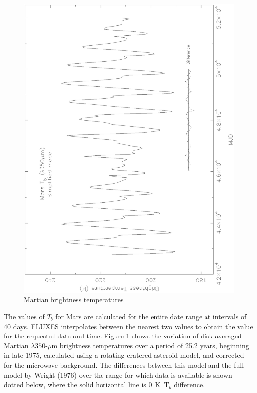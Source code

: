 \documentclass[11pt,twoside]{article}
\renewcommand{\_}{\texttt{\symbol{95}}}
\begin{document}
\begin{figure}
\includegraphics[angle=-90,width=\textwidth]{sun213_fig1.eps}
\vspace*{-0.5cm}
\caption{Martian brightness temperatures}
\label{fig:mars}
\end{figure}

The values of $T_b$ for Mars are calculated for the entire date range
at intervals of 40 days. FLUXES interpolates between the nearest two
values to obtain the value for the requested date and time.
Figure \ref{fig:mars} shows the variation of disk-averaged Martian $\lambda350$-$\mu$m
brightness temperatures over a period of 25.2 years, beginning in late 1975,
calculated using a rotating cratered asteroid model, and corrected for the
microwave background. The differences between this model and the full model
by Wright (1976) over the range for which data is available is shown
dotted below, where the solid horizontal line is 0~K~T$_b$ difference.
\end{document}
